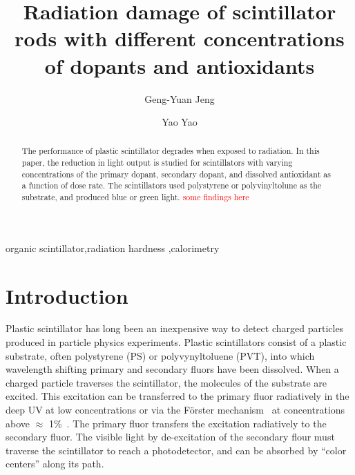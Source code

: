 \documentclass[review]{elsarticle}
\begin{document}
\begin{frontmatter}

\title{Radiation damage of scintillator rods with different concentrations of dopants and antioxidants
}


\author[umd]{Geng-Yuan Jeng}
\author[umd]{Yao Yao}


\address[umd]{Dept. Physics, U. Maryland, College Park MD 30742 USA}



\begin{abstract}
The performance of plastic scintillator degrades when exposed to radiation. 
In this paper, the reduction in light output is studied for scintillators
with varying concentrations of the primary dopant, secondary dopant, and
dissolved antioxidant as a function of dose rate.
The scintillators used polystyrene or polyvinyltolune as the substrate, and
produced blue or green light. \textcolor{red}{some findings here}
\end{abstract}

\begin{keyword}
organic scintillator\sep radiation hardness \sep calorimetry
\end{keyword}

\end{frontmatter}

\linenumbers

\section{Introduction}
Plastic scintillator has long been an inexpensive way to detect charged particles produced in particle physics experiments.
Plastic scintillators consist of a plastic substrate, 
often polystyrene (PS) or polyvynyltoluene (PVT),
into which wavelength 
shifting primary and secondary fluors have been dissolved.
When a charged particle traverses the scintillator, the molecules of the substrate are excited.  
This excitation can be transferred to the primary fluor radiatively in the deep UV at low concentrations or via the F{\"o}rster 
mechanism~\cite{forster} at concentrations above $\approx$ 1\%~\cite{birks}.  
The primary fluor transfers the excitation radiatively to the secondary fluor.  
The visible light by de-excitation of the secondary flour
must traverse the scintillator to reach a photodetector, and can be absorbed by ``color centers'' along its path.
\end{document}
